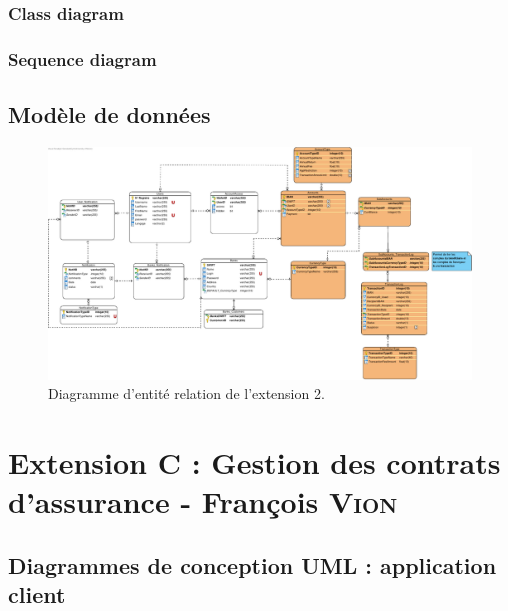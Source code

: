 \documentclass[]{report}
\begin{document}
\newpage

\subsection{Class diagram}

\newpage

\subsection{Sequence diagram}

\newpage

\section{Modèle de données}

\begin{figure}[h]
	\centering\includegraphics[width=\linewidth]{img/BDD - Extension 2.pdf}
	\caption{Diagramme d'entité relation de l'extension 2.}
\end{figure}


\newpage






\chapter{Extension C : Gestion des contrats d’assurance - François \textsc{Vion}}



\newpage



\section{Diagrammes de conception UML : application client}
\end{document}
